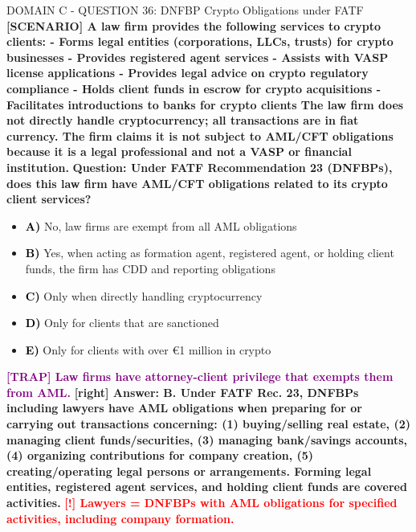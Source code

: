 \documentclass[11pt,a4paper]{beamer}
\newcommand{\redflag}[1]{\textcolor{red}{\textbf{[!] #1}}}
\newcommand{\trap}[1]{\textcolor{purple}{\textbf{[TRAP] #1}}}
\newcommand{\correct}[1]{\textcolor{green!50!black}{\textbf{[right] #1}}}
\newcommand{\scenario}[1]{\textcolor{blue!70!black}{\textbf{[SCENARIO] #1}}}
\newcommand{\option}[1]{\textcolor{black}{\textbf{#1}}}
\begin{document}
\begin{frame}{DOMAIN C - QUESTION 36: DNFBP Crypto Obligations under FATF}
\scenario{A law firm provides the following services to crypto clients:
- Forms legal entities (corporations, LLCs, trusts) for crypto businesses
- Provides registered agent services
- Assists with VASP license applications
- Provides legal advice on crypto regulatory compliance
- Holds client funds in escrow for crypto acquisitions
- Facilitates introductions to banks for crypto clients
The law firm does not directly handle cryptocurrency; all transactions are in fiat currency. The firm claims it is not subject to AML/CFT obligations because it is a legal professional and not a VASP or financial institution.}
\vspace{0.2cm}
\textbf{Question: Under FATF Recommendation 23 (DNFBPs), does this law firm have AML/CFT obligations related to its crypto client services?}
\vspace{0.1cm}
\begin{itemize}
    \item \option{A)} No, law firms are exempt from all AML obligations
    \item \option{B)} Yes, when acting as formation agent, registered agent, or holding client funds, the firm has CDD and reporting obligations
    \item \option{C)} Only when directly handling cryptocurrency
    \item \option{D)} Only for clients that are sanctioned
    \item \option{E)} Only for clients with over €1 million in crypto
\end{itemize}
\vspace{0.2cm}
\trap{Law firms have attorney-client privilege that exempts them from AML.}
\correct{Answer: B. Under FATF Rec. 23, DNFBPs including lawyers have AML obligations when preparing for or carrying out transactions concerning: (1) buying/selling real estate, (2) managing client funds/securities, (3) managing bank/savings accounts, (4) organizing contributions for company creation, (5) creating/operating legal persons or arrangements. Forming legal entities, registered agent services, and holding client funds are covered activities.}
\redflag{Lawyers = DNFBPs with AML obligations for specified activities, including company formation.}
\end{frame}

\end{document}
